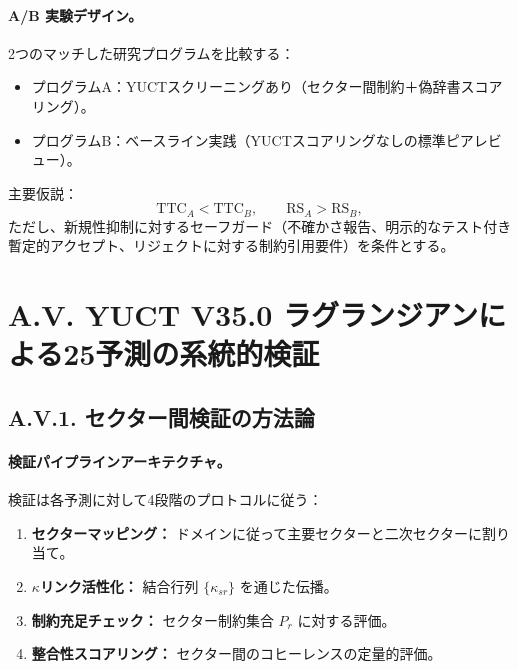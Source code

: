 \documentclass[13pt,a4paper]{ltjsarticle}
\begin{document}
	\paragraph{A/B 実験デザイン。}
	2つのマッチした研究プログラムを比較する：
	\begin{itemize}[leftmargin=*]
		\item プログラムA：YUCTスクリーニングあり（セクター間制約＋偽辞書スコアリング）。
		\item プログラムB：ベースライン実践（YUCTスコアリングなしの標準ピアレビュー）。
	\end{itemize}
	主要仮説：
	$$
	\mathrm{TTC}_A < \mathrm{TTC}_B,\qquad \mathrm{RS}_A > \mathrm{RS}_B,
	$$
	ただし、新規性抑制に対するセーフガード（不確かさ報告、明示的なテスト付き暫定的アクセプト、リジェクトに対する制約引用要件）を条件とする。
	
	\section*{A.V. YUCT V35.0 ラグランジアンによる25予測の系統的検証}
	
	\subsection*{A.V.1. セクター間検証の方法論}
	
	\paragraph{検証パイプラインアーキテクチャ。}
	検証は各予測に対して4段階のプロトコルに従う：
	
	\begin{enumerate}[leftmargin=*]
		\item \textbf{セクターマッピング：} ドメインに従って主要セクターと二次セクターに割り当て。
		\item \textbf{$\kappa$リンク活性化：} 結合行列 $\{\kappa_{sr}\}$ を通じた伝播。
		\item \textbf{制約充足チェック：} セクター制約集合 $P_r$ に対する評価。
		\item \textbf{整合性スコアリング：} セクター間のコヒーレンスの定量的評価。
	\end{enumerate}
	
\end{document}
